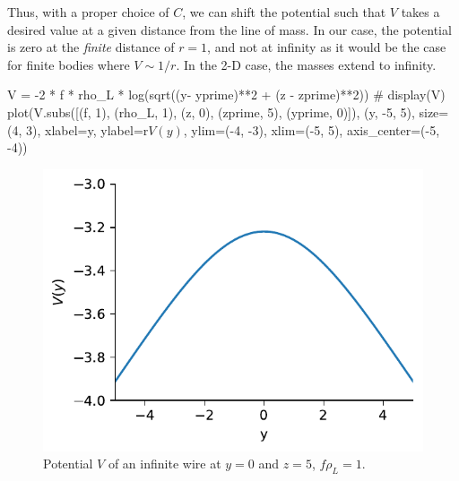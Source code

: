 \documentclass[
  a4paper,
  DIV=11,
  numbers=noendperiod]{scrreprt}
\newenvironment{Shaded}{\begin{snugshade}}{\end{snugshade}}
\newcommand{\CommentTok}[1]{\textcolor[rgb]{0.37,0.37,0.37}{#1}}
\newcommand{\DecValTok}[1]{\textcolor[rgb]{0.68,0.00,0.00}{#1}}
\newcommand{\NormalTok}[1]{\textcolor[rgb]{0.00,0.23,0.31}{#1}}
\newcommand{\OperatorTok}[1]{\textcolor[rgb]{0.37,0.37,0.37}{#1}}
\newcommand{\StringTok}[1]{\textcolor[rgb]{0.13,0.47,0.30}{#1}}
\newcommand{\VerbatimStringTok}[1]{\textcolor[rgb]{0.13,0.47,0.30}{#1}}
\begin{document}
Thus, with a proper choice of \(C\), we can shift the potential such
that \(V\) takes a desired value at a given distance from the line of
mass. In our case, the potential is zero at the \emph{finite} distance
of \(r=1\), and not at infinity as it would be the case for finite
bodies where \(V \sim 1/r\). In the 2-D case, the masses extend to
infinity.

\begin{Shaded}
\begin{Highlighting}[]
\NormalTok{V }\OperatorTok{=} \OperatorTok{{-}}\DecValTok{2} \OperatorTok{*}\NormalTok{ f }\OperatorTok{*}\NormalTok{ rho\_L }\OperatorTok{*}\NormalTok{ log(sqrt((y}\OperatorTok{{-}}\NormalTok{ yprime)}\OperatorTok{**}\DecValTok{2} \OperatorTok{+}\NormalTok{ (z }\OperatorTok{{-}}\NormalTok{ zprime)}\OperatorTok{**}\DecValTok{2}\NormalTok{))}
\CommentTok{\# display(V)}
\NormalTok{plot(V.subs([(f, }\DecValTok{1}\NormalTok{), (rho\_L, }\DecValTok{1}\NormalTok{), (z, }\DecValTok{0}\NormalTok{), (zprime, }\DecValTok{5}\NormalTok{), (yprime, }\DecValTok{0}\NormalTok{)]),}
\NormalTok{  (y, }\OperatorTok{{-}}\DecValTok{5}\NormalTok{, }\DecValTok{5}\NormalTok{), size}\OperatorTok{=}\NormalTok{(}\DecValTok{4}\NormalTok{, }\DecValTok{3}\NormalTok{),}
\NormalTok{  xlabel}\OperatorTok{=}\StringTok{\textquotesingle{}y\textquotesingle{}}\NormalTok{, ylabel}\OperatorTok{=}\VerbatimStringTok{r\textquotesingle{}$V(y)$\textquotesingle{}}\NormalTok{, ylim}\OperatorTok{=}\NormalTok{(}\OperatorTok{{-}}\DecValTok{4}\NormalTok{, }\OperatorTok{{-}}\DecValTok{3}\NormalTok{), xlim}\OperatorTok{=}\NormalTok{(}\OperatorTok{{-}}\DecValTok{5}\NormalTok{, }\DecValTok{5}\NormalTok{), axis\_center}\OperatorTok{=}\NormalTok{(}\OperatorTok{{-}}\DecValTok{5}\NormalTok{, }\OperatorTok{{-}}\DecValTok{4}\NormalTok{))}
\end{Highlighting}
\end{Shaded}

\begin{figure}[H]

{\centering \includegraphics{line_of_mass_files/figure-pdf/cell-4-output-1.pdf}

}

\caption{Potential \(V\) of an infinite wire at \(y=0\) and \(z=5\),
\(f \rho_L = 1\).}

\end{figure}%
\end{document}
